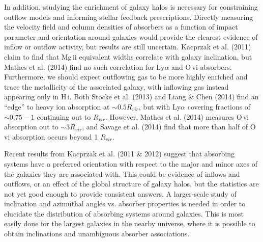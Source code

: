\documentclass[iop]{emulateapj-rtx4}
\begin{document}
In addition, studying the enrichment of galaxy halos is necessary for constraining outflow models and informing stellar feedback prescriptions. Directly measuring the velocity field and column densities of absorbers as a function of impact parameter and orientation around galaxies would provide the clearest evidence of inflow or outflow activity, but results are still uncertain. Kacprzak et al. (2011) claim to find that Mg\,{\sc ii} equivalent widths correlate with galaxy inclination, but Mathes et al. (2014) find no such correlation for Ly$\alpha$ and O\,{\sc vi} absorbers. Furthermore, we should expect outflowing gas to be more highly enriched and trace the metallicity of the associated galaxy, with inflowing gas instead appearing only in H\,{\sc i}. Both Stocke et al. (2013) and Liang $\&$ Chen (2014) find an ``edge'' to heavy ion absorption at $\sim0.5R_{vir}$, but with Ly$\alpha$ covering fractions of $\sim0.75-1$ continuing out to $R_{vir}$. However, Mathes et al. (2014) measures O\,{\sc vi} absorption out to $\sim3 R_{vir}$, and Savage et al. (2014) find that more than half of O\,{\sc vi} absorption occurs beyond 1 $R_{vir}$.



Recent results from Kacprzak et al. (2011 $\&$ 2012) suggest that absorbing systems have a preferred orientation with respect to the major and minor axes of the galaxies they are associated with. This could be evidence of inflows and outflows, or an effect of the global structure of galaxy halos, but the statistics are not yet good enough to provide consistent answers. A larger-scale study of inclination and azimuthal angles vs. absorber properties is needed in order to elucidate the distribution of absorbing systems around galaxies. This is most easily done for the largest galaxies in the nearby universe, where it is possible to obtain inclinations and unambiguous absorber associations. 
\end{document}
